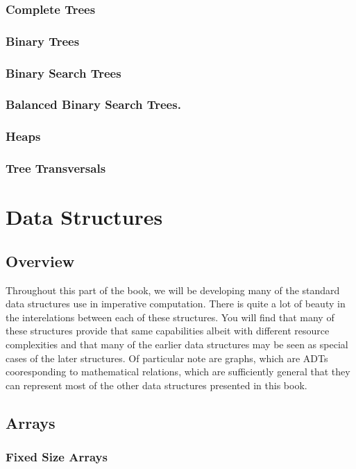 \documentclass[12pt, letterpaper]{book}
\begin{document}
	\subsection{Complete Trees}
	\subsection{Binary Trees}
	\subsection{Binary Search Trees}
	\subsection{Balanced Binary Search Trees.}
	\subsection{Heaps}
	\subsection{Tree Transversals} \label{Tree Transversals}

\chapter{Data Structures}

\section[Overview]{Overview}

Throughout this part of the book, we will be developing many of the standard data structures use in imperative computation. There is quite a lot of beauty in the interelations between each of these structures. You will find that many of these structures provide that same capabilities albeit with different resource complexities and that many of the earlier data structures may be seen as special cases of the later structures. Of particular note are graphs, which are ADTs cooresponding to mathematical relations, which are sufficiently general that they can represent most of the other data structures presented in this book.

\section{Arrays} \label{arrays}

\subsection{Fixed Size Arrays}
\end{document}
